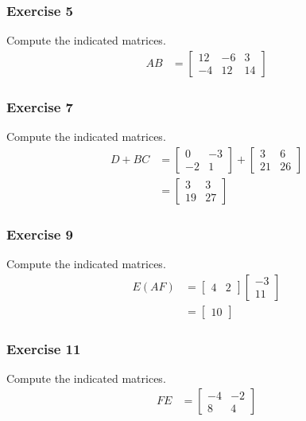 \documentclass[letterpaper, 12pt]{math}
\begin{document}
\subsubsection*{Exercise 5}
Compute the indicated matrices.
\begin{align*}
  AB &= \begin{bmatrix}
    12 & -6 & 3 \\
    -4 & 12 & 14
  \end{bmatrix}
\end{align*}

\subsubsection*{Exercise 7}
Compute the indicated matrices.
\begin{align*}
  D+BC &= \begin{bmatrix}
    0 & -3 \\
    -2 & 1
  \end{bmatrix}+\begin{bmatrix}
    3 & 6 \\
    21 & 26
  \end{bmatrix} \\
  &= \begin{bmatrix}
    3 & 3 \\
    19 & 27
  \end{bmatrix}
\end{align*}

\subsubsection*{Exercise 9}
Compute the indicated matrices.
\begin{align*}
  E(AF) &= \begin{bmatrix}
    4 & 2
  \end{bmatrix}\begin{bmatrix}
    -3 \\ 11
  \end{bmatrix} \\
  &= \begin{bmatrix}10\end{bmatrix}
\end{align*}

\subsubsection*{Exercise 11}
Compute the indicated matrices.
\begin{align*}
  FE &= \begin{bmatrix}
    -4 & -2 \\
    8 & 4
  \end{bmatrix}
\end{align*}
\end{document}
